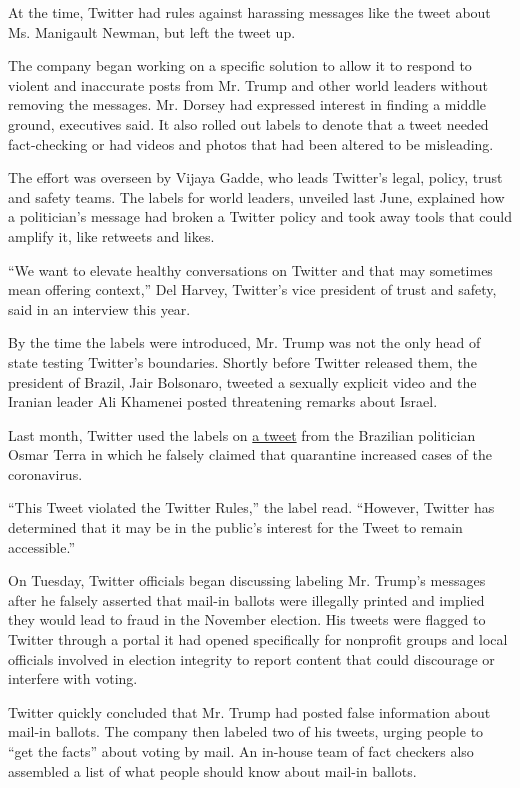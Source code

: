 At the time, Twitter had rules against harassing messages like the tweet
about Ms. Manigault Newman, but left the tweet up.

The company began working on a specific solution to allow it to respond
to violent and inaccurate posts from Mr. Trump and other world leaders
without removing the messages. Mr. Dorsey had expressed interest in
finding a middle ground, executives said. It also rolled out labels to
denote that a tweet needed fact-checking or had videos and photos that
had been altered to be misleading.

The effort was overseen by Vijaya Gadde, who leads Twitter's legal,
policy, trust and safety teams. The labels for world leaders, unveiled
last June, explained how a politician's message had broken a Twitter
policy and took away tools that could amplify it, like retweets and
likes.

``We want to elevate healthy conversations on Twitter and that may
sometimes mean offering context,'' Del Harvey, Twitter's vice president
of trust and safety, said in an interview this year.

By the time the labels were introduced, Mr. Trump was not the only head
of state testing Twitter's boundaries. Shortly before Twitter released
them, the president of Brazil, Jair Bolsonaro, tweeted a sexually
explicit video and the Iranian leader Ali Khamenei posted threatening
remarks about Israel.

Last month, Twitter used the labels on
\href{https://twitter.com/OsmarTerra/status/1246474430676643842}{a
tweet} from the Brazilian politician Osmar Terra in which he falsely
claimed that quarantine increased cases of the coronavirus.

``This Tweet violated the Twitter Rules,'' the label read. ``However,
Twitter has determined that it may be in the public's interest for the
Tweet to remain accessible.''

On Tuesday, Twitter officials began discussing labeling Mr. Trump's
messages after he falsely asserted that mail-in ballots were illegally
printed and implied they would lead to fraud in the November election.
His tweets were flagged to Twitter through a portal it had opened
specifically for nonprofit groups and local officials involved in
election integrity to report content that could discourage or interfere
with voting.

Twitter quickly concluded that Mr. Trump had posted false information
about mail-in ballots. The company then labeled two of his tweets,
urging people to ``get the facts'' about voting by mail. An in-house
team of fact checkers also assembled a list of what people should know
about mail-in ballots.

